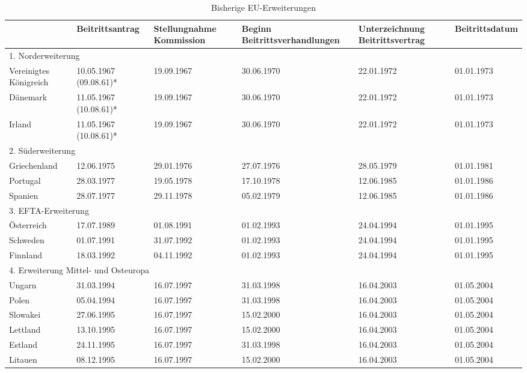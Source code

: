 \begin{table}[H]\vspace{1ex}\centering
\caption{Bisherige EU-Erweiterungen}
\begin{tabular}{|p{2cm}|p{2cm}|p{2cm}|p{2cm}|p{2cm}|p{2cm}|}\hline
&Beitritts\-antrag&Stellung\-nahme Kommis\-sion&Beginn Beitritts\-verhand\-lungen&Unter\-zeichnung Beitritts\-vertrag&Beitritts\-datum\\\hline
\multicolumn{6}{|p{12cm}|}{1. Norderweiterung} \\\hline 
Vereinigtes Königreich&
10.05.1967 (09.08.61)*&
19.09.1967&
30.06.1970&
22.01.1972&
01.01.1973\\\hline
Dänemark&
11.05.1967 (10.08.61)*&
19.09.1967&
30.06.1970&
22.01.1972&
01.01.1973\\\hline
Irland&
11.05.1967 (10.08.61)*&
19.09.1967&
30.06.1970&
22.01.1972&
01.01.1973\\\hline
\multicolumn{6}{|p{12cm}|}{2. Süderweiterung}\\\hline
Griechenland &
12.06.1975&
29.01.1976&
27.07.1976&
28.05.1979&
01.01.1981\\\hline
Portugal&
28.03.1977&
19.05.1978&
17.10.1978&
12.06.1985&
01.01.1986\\\hline
Spanien&
28.07.1977&
29.11.1978&
05.02.1979&
12.06.1985&
01.01.1986\\\hline
\multicolumn{6}{|p{12cm}|}{3. EFTA-Erweiterung}\\\hline
Österreich&
17.07.1989&
01.08.1991&
01.02.1993&
24.04.1994&
01.01.1995\\\hline
Schweden&
01.07.1991&
31.07.1992&
01.02.1993&
24.04.1994&
01.01.1995\\\hline
Finnland&
18.03.1992&
04.11.1992&
01.02.1993&
24.04.1994&
01.01.1995\\\hline
\multicolumn{6}{|p{12cm}|}{4. Erweiterung Mittel- und Osteuropa}\\\hline
Ungarn&
31.03.1994&
16.07.1997&
31.03.1998&
16.04.2003&
01.05.2004\\\hline
Polen&
05.04.1994&
16.07.1997&
31.03.1998&
16.04.2003&
01.05.2004\\\hline
Slowakei&
27.06.1995&
16.07.1997&
15.02.2000&
16.04.2003&
01.05.2004\\\hline
Lettland&
13.10.1995&
16.07.1997&
15.02.2000&
16.04.2003&
01.05.2004\\\hline
Estland&
24.11.1995&
16.07.1997&
31.03.1998&
16.04.2003&
01.05.2004\\\hline
Litauen&
08.12.1995&
16.07.1997&
15.02.2000&
16.04.2003&
01.05.2004\\\hline

\end{tabular}
\end{table}
